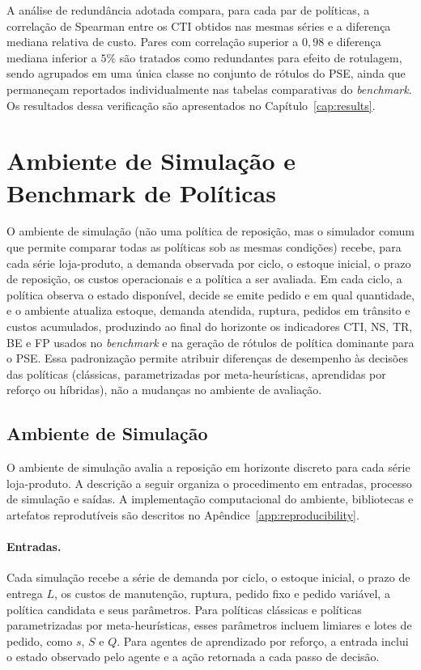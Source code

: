 A análise de redundância adotada compara, para cada par de políticas, a correlação de Spearman entre os CTI obtidos nas mesmas séries e a diferença mediana relativa de custo. Pares com correlação superior a $0{,}98$ e diferença mediana inferior a $5\%$ são tratados como redundantes para efeito de rotulagem, sendo agrupados em uma única classe no conjunto de rótulos do PSE, ainda que permaneçam reportados individualmente nas tabelas comparativas do \textit{benchmark}. Os resultados dessa verificação são apresentados no Capítulo~\ref{cap:results}.

\section{Ambiente de Simulação e Benchmark de Políticas}
\label{sec:simulacao_benchmark}

O ambiente de simulação (não uma política de reposição, mas o simulador comum que permite comparar todas as políticas sob as mesmas condições) recebe, para cada série loja-produto, a demanda observada por ciclo, o estoque inicial, o prazo de reposição, os custos operacionais e a política a ser avaliada. Em cada ciclo, a política observa o estado disponível, decide se emite pedido e em qual quantidade, e o ambiente atualiza estoque, demanda atendida, ruptura, pedidos em trânsito e custos acumulados, produzindo ao final do horizonte os indicadores CTI, NS, TR, BE e FP usados no \textit{benchmark} e na geração de rótulos de política dominante para o PSE. Essa padronização permite atribuir diferenças de desempenho às decisões das políticas (clássicas, parametrizadas por meta-heurísticas, aprendidas por reforço ou híbridas), não a mudanças no ambiente de avaliação.

\subsection{Ambiente de Simulação}\label{sec:ambiente_simulacao}

O ambiente de simulação avalia a reposição em horizonte discreto para cada série loja-produto. A descrição a seguir organiza o procedimento em entradas, processo de simulação e saídas. A implementação computacional do ambiente, bibliotecas e artefatos reprodutíveis são descritos no Apêndice~\ref{app:reproducibility}.

\paragraph{Entradas.}
Cada simulação recebe a série de demanda por ciclo, o estoque inicial, o prazo de entrega $L$, os custos de manutenção, ruptura, pedido fixo e pedido variável, a política candidata e seus parâmetros. Para políticas clássicas e políticas parametrizadas por meta-heurísticas, esses parâmetros incluem limiares e lotes de pedido, como $s$, $S$ e $Q$. Para agentes de aprendizado por reforço, a entrada inclui o estado observado pelo agente e a ação retornada a cada passo de decisão.

